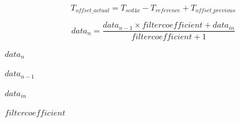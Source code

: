 \documentclass{article}
\begin{document}
\[
T_{offset\_actual} = T_{scd4x} - T_{reference} + T_{offset\_previous}
\]
\pagebreak

\[
  data_n = \frac{data_{n-1} \times filtercoefficient + data_{in}}{filtercoefficient + 1}
\]
\pagebreak

$ data_n $
\pagebreak

$ data_{n-1} $
\pagebreak

$ data_{in} $
\pagebreak

$ filtercoefficient $
\pagebreak
\end{document}
